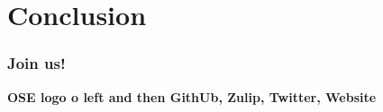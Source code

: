 \section{Conclusion}
\begin{frame}\frametitle{Join us!}

  \textbf{OSE logo o left and then GithUb, Zulip, Twitter, Website}

\end{frame}
